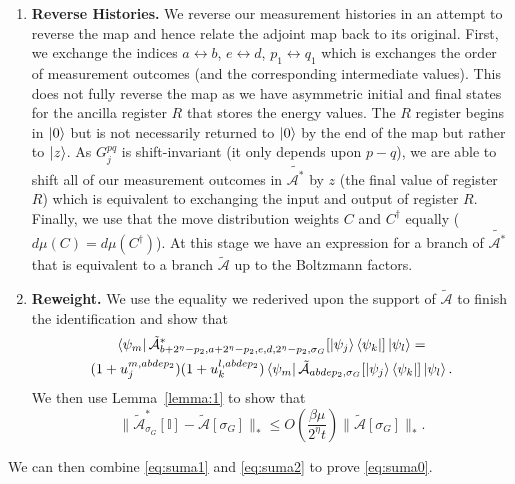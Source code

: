 \documentclass[aps,floatfix,10pt,amssymb,amsfont,amsmath,superscriptaddress,float,nofootinbib,longbibliography,nobalancelastpage,twocolumn]{revtex4-2}
\begin{document}
\begin{enumerate}
\item \textbf{Reverse Histories.} We reverse our measurement histories in an attempt to reverse the map and hence relate the adjoint map back to its original. First, we exchange the indices $a \leftrightarrow b$, $e \leftrightarrow d$, $p_1 \leftrightarrow q_1$ which is exchanges the order of measurement outcomes (and the corresponding intermediate values). This does not fully reverse the map as we have asymmetric initial and final states for the ancilla register $R$ that stores the energy values. The $R$ register begins in $\ket{0}$ but is not necessarily returned to $\ket{0}$ by the end of the map but rather to $\ket{z}$. As $G^{pq}_j$ is shift-invariant (it only depends upon $p-q$), we are able to shift all of our measurement outcomes in $\tilde{\mathcal{A}^*}$ by $z$ (the final value of register $R$) which is equivalent to exchanging the input and output of register $R$. Finally, we use that the move distribution weights $C$ and $C^{\dagger}$ equally ($d\mu(C) = d\mu(C^{\dagger})$). At this stage we have an expression for a branch of $\tilde{\mathcal{A}^*}$ that is equivalent to a branch $\tilde{\mathcal{A}}$ up to the Boltzmann factors.
\item \textbf{Reweight.} We use the equality we rederived upon the support of $\tilde{\mathcal{A}}$ to finish the identification and show that
\begin{multline}
  \bra{\psi_m}\tilde{\mathcal{A}}^*_{b+2^{\eta}-p_2,a+2^{\eta}-p_2,e,d,2^{\eta}-p_2,\sigma_G}[\ket{\psi_j}\bra{\psi_k}]\ket{\psi_l} 
   =\\(1+u_j^{m,abdep_2})(1+u_k^{l,abdep_2})\bra{\psi_m}\tilde{\mathcal{A}}_{abdep_2,\sigma_G}[\ket{\psi_j}\bra{\psi_k}]\ket{\psi_l}.
\end{multline}
We then use Lemma~\ref{lemma:1} to show that 
\begin{equation}
    \|\tilde{\mathcal{A}}^*_{\sigma_G}[\mathbb{I}] - \tilde{\mathcal{A}}[\sigma_G]\|_* \leq O\left(\frac{\beta \mu}{2^{\eta}t}\right)\|\tilde{\mathcal{A}}[\sigma_G]\|_*.
    \label{eq:suma2}
\end{equation}
\end{enumerate}
We can then combine \eqref{eq:suma1} and \eqref{eq:suma2} to prove \eqref{eq:suma0}.
\end{document}
